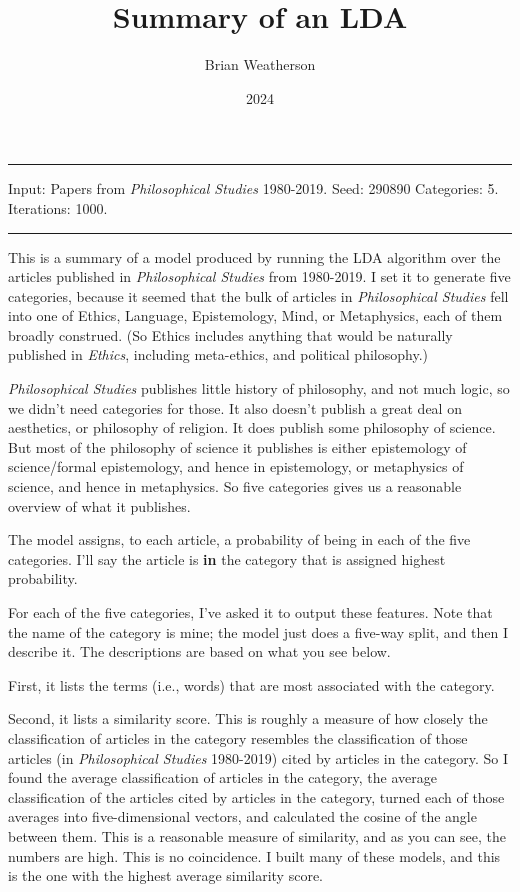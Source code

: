 \documentclass[
  10pt,
  letterpaper,
  DIV=11,
  numbers=noendperiod,
  twoside]{scrartcl}
\title{Summary of an LDA}
\author{Brian Weatherson}
\date{2024}
\renewenvironment{abstract}
 {\vspace{-1.25cm}
 \quotation\small\noindent\rule{\linewidth}{.5pt}\par\smallskip
 \noindent }
 {\par\noindent\rule{\linewidth}{.5pt}\endquotation}
\begin{document}
\maketitle
\begin{abstract}
Input: Papers from \emph{Philosophical Studies} 1980-2019. Seed: 290890
Categories: 5. Iterations: 1000.
\end{abstract}


This is a summary of a model produced by running the LDA algorithm over
the articles published in \emph{Philosophical Studies} from 1980-2019. I
set it to generate five categories, because it seemed that the bulk of
articles in \emph{Philosophical Studies} fell into one of Ethics,
Language, Epistemology, Mind, or Metaphysics, each of them broadly
construed. (So Ethics includes anything that would be naturally
published in \emph{Ethics}, including meta-ethics, and political
philosophy.)

\emph{Philosophical Studies} publishes little history of philosophy, and
not much logic, so we didn't need categories for those. It also doesn't
publish a great deal on aesthetics, or philosophy of religion. It does
publish some philosophy of science. But most of the philosophy of
science it publishes is either epistemology of science/formal
epistemology, and hence in epistemology, or metaphysics of science, and
hence in metaphysics. So five categories gives us a reasonable overview
of what it publishes.

The model assigns, to each article, a probability of being in each of
the five categories. I'll say the article is \textbf{in} the category
that is assigned highest probability.

For each of the five categories, I've asked it to output these features.
Note that the name of the category is mine; the model just does a
five-way split, and then I describe it. The descriptions are based on
what you see below.

First, it lists the terms (i.e., words) that are most associated with
the category.

Second, it lists a similarity score. This is roughly a measure of how
closely the classification of articles in the category resembles the
classification of those articles (in \emph{Philosophical Studies}
1980-2019) cited by articles in the category. So I found the average
classification of articles in the category, the average classification
of the articles cited by articles in the category, turned each of those
averages into five-dimensional vectors, and calculated the cosine of the
angle between them. This is a reasonable measure of similarity, and as
you can see, the numbers are high. This is no coincidence. I built many
of these models, and this is the one with the highest average similarity
score.
\end{document}
